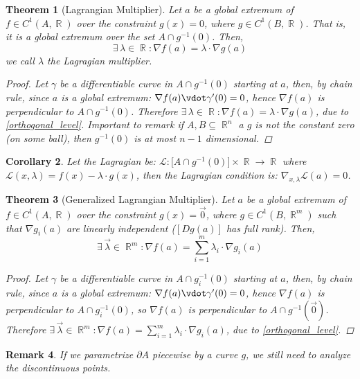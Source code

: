 \documentclass[12pt]{article}
\renewcommand{\grad}{\nabla}
\newcommand{\Exist}[1]{\exists\,{#1}:}
\DeclareMathOperator{\R}{\mathbb{R}}
\newtheorem{theorem}{Theorem}[subsection]
\newtheorem{corollary}[theorem]{Corollary}
\newtheorem{remark}[theorem]{Remark}
\begin{document}
\begin{theorem}[Lagrangian Multiplier]
  Let $a$ be a global extremum of $f\in C^1(A,\R)$ over the constraint $g(x)=0$, where $g\in C^1(B,\R)$. That is, it is a global extremum over the set $A\cap g^{-1}(0)$. Then, $$\Exist{\lambda\in\R}\grad f(a)=\lambda\cdot\grad g(a)$$
  we call $\lambda$ the Lagragian multiplier.
  \begin{proof}
    Let $\gamma$ be a differentiable curve in $A\cap g^{-1}(0)$ starting at $a$, then, by chain rule, since $a$ is a global extremum: $\grad f(a)\vdot\gamma'(0)=0$, hence $\grad f(a)$ is perpendicular to $A\cap g^{-1}(0)$. Therefore $\Exist{\lambda\in\R}\grad f(a)=\lambda\cdot\grad g(a)$, due to \ref{orthogonal_level}. Important to remark if $A,B\subseteq\R^n$ a $g$ is not the constant zero (on some ball), then $g^{-1}(0)$ is at most $n-1$ dimensional.
  \end{proof}
\end{theorem}

\begin{corollary}
  Let the Lagragian be: $\mathcal{L}:\Big[A\cap g^{-1}(0)\Big]\times\R\to\R$ where $\mathcal{L}(x,\lambda)=f(x)-\lambda\cdot g(x)$, then the Lagragian condition is: $\grad_{x,\lambda}\mathcal{L}(a)=0$.
\end{corollary}

\begin{theorem}[Generalized Lagrangian Multiplier]
  Let $a$ be a global extremum of $f\in C^1(A,\R)$ over the constraint $g(x)=\vec{0}$, where $g\in C^1(B,\R^m)$ such that $\grad g_i(a)$ are linearly independent ($[Dg(a)]$ has full rank). Then, $$\Exist{\vec{\lambda}\in\R^m}\grad f(a)=\sum_{i=1}^m\lambda_i\cdot\grad g_i(a)$$
  \begin{proof}
    Let $\gamma$ be a differentiable curve in $A\cap g_i^{-1}(0)$ starting at $a$, then, by chain rule, since $a$ is a global extremum: $\grad f(a)\vdot\gamma'(0)=0$, hence $\grad f(a)$ is perpendicular to $A\cap g_i^{-1}(0)$, so $\grad f(a)$ is perpendicular to $A\cap g^{-1}(\vec{0})$. Therefore $\Exist{\vec{\lambda}\in\R^m}\grad f(a)=\sum_{i=1}^m\lambda_i\cdot\grad g_i(a)$, due to \ref{orthogonal_level}.
  \end{proof}
\end{theorem}

\begin{remark}
  If we parametrize $\partial A$ piecewise by a curve $g$, we still need to analyze the discontinuous points.
\end{remark}
\end{document}
